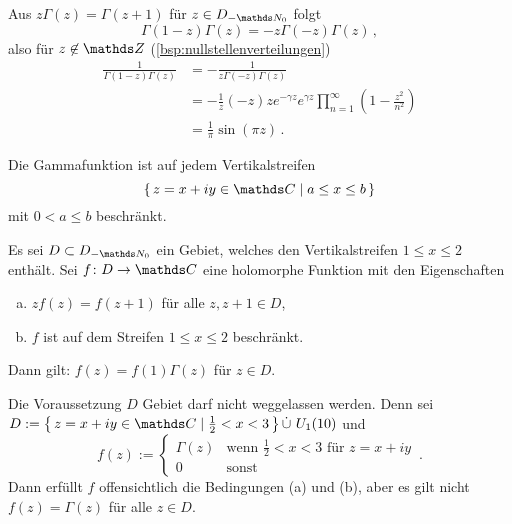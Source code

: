 \begin{bewe-list}
\item Aus $z\Gamma(z) = \Gamma(z+1)$ für $z\in D_{-\NN_0}$ folgt
\[
	\Gamma(1-z)\Gamma(z)
	= -z \Gamma(-z)\Gamma(z)
	\,,
\]
also für $z\not\in \ZZ$ (\autoref{bsp:nullstellenverteilungen})
\begin{align*}
	\frac{1}{\Gamma(1-z)\Gamma(z)}
	&= -\frac{1}{z\Gamma(-z)\Gamma(z)} \\
	&= -\frac{1}{z}(-z)ze^{-\gamma z}e^{\gamma z}\prod_{n=1}^\infty \left(1-\frac{z^2}{n^2}\right) \\
	&= \frac{1}{\pi} \sin(\pi z)
	\,.
\end{align*}
\end{bewe-list}

\begin{satz-list}\label{satz:wielandt}
\item Die Gammafunktion ist auf jedem Vertikalstreifen
\[
	\Set{z=x+iy \in\CC \mid a \leq x \leq b}
\]
mit $0 < a \leq b$ beschränkt.

\item Es sei $D\subset D_{-\NN_0}$ ein Gebiet, welches den Vertikalstreifen $1 \leq x \leq 2$ enthält.
Sei $f\colon D\ra \CC$ eine holomorphe Funktion mit den Eigenschaften
\begin{enumerate}[(a)]
\item $zf(z) = f(z+1)$ für alle $z, z+1\in D$,
\item $f$ ist auf dem Streifen $1\leq x \leq 2$ beschränkt.
\end{enumerate}
Dann gilt:
$f(z) = f(1) \Gamma(z)$ für $z\in D$.
\end{satz-list}

\begin{beme}
Die Voraussetzung $D$ Gebiet darf nicht weggelassen werden.
Denn sei $D := \Set{z = x+iy\in\CC \mid \frac{1}{2} < x < 3} \dot\cup\ U_1(10)$ und
\[
	f(z) :=
	\begin{cases}
		\Gamma(z) &\text{wenn } \frac{1}{2} < x < 3 \text{ für } z=x+iy \\
		0 &\text{sonst}
	\end{cases}
	\,.
\]
Dann erfüllt $f$ offensichtlich die Bedingungen (a) und (b), aber es gilt nicht $f(z) = \Gamma(z)$ für alle $z\in D$.
\end{beme}


